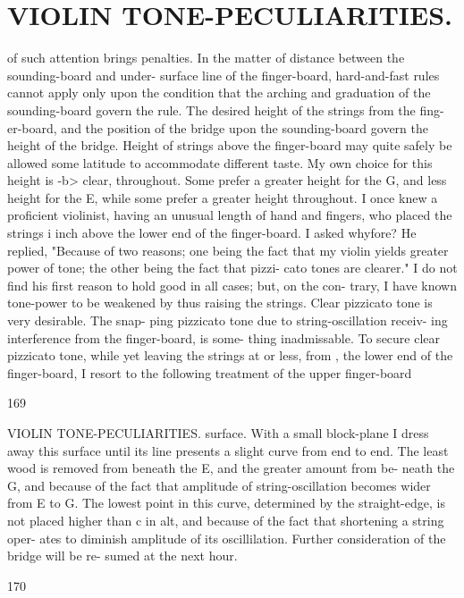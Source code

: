 \documentclass{article}
\begin{document}
\section*{VIOLIN TONE-PECULIARITIES.}
of such attention brings penalties. In the matter of distance between the sounding-board and under- surface line of the finger-board, hard-and-fast rules cannot apply only upon the condition that the arching and graduation of the sounding-board govern the rule. The desired height of the strings from the fing- er-board, and the position of the bridge upon the sounding-board govern the height of the bridge. Height of strings above the finger-board may quite safely be allowed some latitude to accommodate different taste. My own choice for this height is -b> clear, throughout. Some prefer a greater height for the G, and less height for the E, while some prefer a greater height throughout. I once knew a proficient violinist, having an unusual length of hand and fingers, who placed the strings i inch above the lower end of the finger-board. I asked whyfore? He replied, "Because of two reasons; one being the fact that my violin yields greater power of tone; the other being the fact that pizzi- cato tones are clearer." I do not find his first reason to hold good in all cases; but, on the con- trary, I have known tone-power to be weakened by thus raising the strings. Clear pizzicato tone is very desirable. The snap- ping pizzicato tone due to string-oscillation receiv- ing interference from the finger-board, is some- thing inadmissable. To secure clear pizzicato tone, while yet leaving the strings at or less, from , the lower end of the finger-board, I resort to the following treatment of the upper finger-board

169

VIOLIN TONE-PECULIARITIES. surface. With a small block-plane I dress away this surface until its line presents a slight curve from end to end. The least wood is removed from beneath the E, and the greater amount from be- neath the G, and because of the fact that amplitude of string-oscillation becomes wider from E to G. The lowest point in this curve, determined by the straight-edge, is not placed higher than c in alt, and because of the fact that shortening a string oper- ates to diminish amplitude of its oscillilation. Further consideration of the bridge will be re- sumed at the next hour.

170
\end{document}
